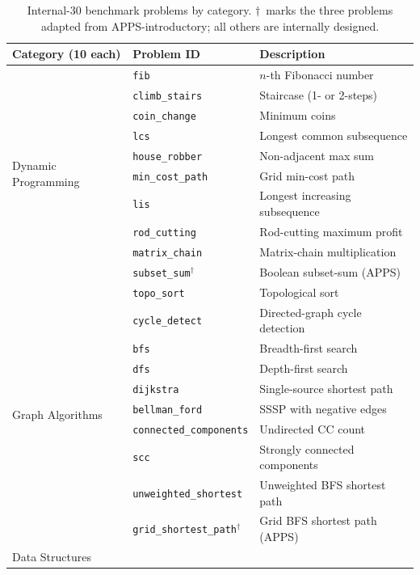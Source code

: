 \documentclass[journal]{IEEEtran}
\begin{document}
\begin{table}[!t]
\caption{Internal-30 benchmark problems by category. $\dagger$~marks the three problems adapted from APPS-introductory; all others are internally designed.}
\label{tab:internal30}
\centering
\footnotesize
\begin{tabular}{@{}lll@{}}
\toprule
\textbf{Category (10 each)} & \textbf{Problem ID} & \textbf{Description} \\
\midrule
\multirow{10}{*}{Dynamic Programming}
  & \texttt{fib}              & $n$-th Fibonacci number \\
  & \texttt{climb\_stairs}    & Staircase (1- or 2-steps) \\
  & \texttt{coin\_change}     & Minimum coins \\
  & \texttt{lcs}              & Longest common subsequence \\
  & \texttt{house\_robber}    & Non-adjacent max sum \\
  & \texttt{min\_cost\_path}  & Grid min-cost path \\
  & \texttt{lis}              & Longest increasing subsequence \\
  & \texttt{rod\_cutting}     & Rod-cutting maximum profit \\
  & \texttt{matrix\_chain}    & Matrix-chain multiplication \\
  & \texttt{subset\_sum}$^\dagger$ & Boolean subset-sum (APPS) \\
\midrule
\multirow{10}{*}{Graph Algorithms}
  & \texttt{topo\_sort}       & Topological sort \\
  & \texttt{cycle\_detect}    & Directed-graph cycle detection \\
  & \texttt{bfs}              & Breadth-first search \\
  & \texttt{dfs}              & Depth-first search \\
  & \texttt{dijkstra}         & Single-source shortest path \\
  & \texttt{bellman\_ford}    & SSSP with negative edges \\
  & \texttt{connected\_components} & Undirected CC count \\
  & \texttt{scc}              & Strongly connected components \\
  & \texttt{unweighted\_shortest} & Unweighted BFS shortest path \\
  & \texttt{grid\_shortest\_path}$^\dagger$ & Grid BFS shortest path (APPS) \\
\midrule
\multirow{10}{*}{Data Structures}

\end{tabular}
\end{table}
\end{document}
